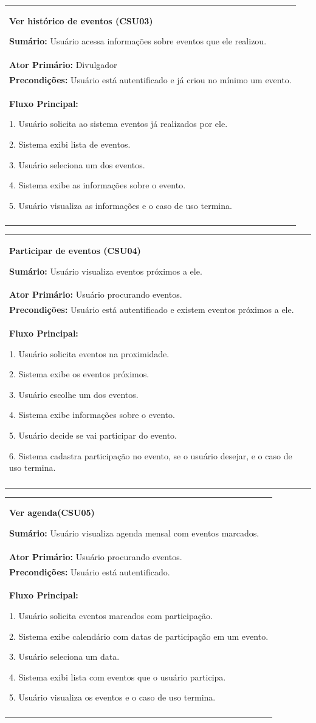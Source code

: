 \documentclass{article}
\newcommand{\sumario}[1] {\textbf{Sumário:} #1\\ \medskip}
\newcommand{\ator}[1] {\textbf{Ator Primário:} #1\\ \medskip}
\newcommand{\precond}[1] {\textbf{Precondições:} #1\\ \medskip}
\newcommand{\fluxo}{\textbf{Fluxo Principal:} \medskip}
\newenvironment{boxed}[1]
    {
\begin{center}
    \begin{tabular}{|p{\textwidth}|}
    \hline
\begin{center}
	{\large \textbf{#1}}
\end{center}
    }
    { 
    \\\\\hline
    \end{tabular} 
    \end{center}
    }
\begin{document}
	\begin{boxed}{Ver histórico de eventos (CSU03)}
	\sumario{Usuário acessa informações sobre eventos que ele realizou.}
	\ator{Divulgador}
	\precond{Usuário está autentificado e já criou no mínimo um evento.}
	\fluxo

	1. Usuário solicita ao sistema eventos já realizados por ele.

	2. Sistema exibi lista de eventos.

	3. Usuário seleciona um dos eventos.

	4. Sistema exibe as informações sobre o evento.

	5. Usuário visualiza as informações e o caso de uso termina.

	\end{boxed}
	\begin{boxed}{Participar de  eventos (CSU04)}
	\sumario{Usuário visualiza eventos próximos a ele.}
	\ator{Usuário procurando eventos.}
	
	\precond{Usuário está autentificado e existem eventos próximos a ele.}

	\fluxo
	
	1. Usuário solicita eventos na proximidade.
	
	2. Sistema exibe os eventos próximos.
	
	3. Usuário escolhe um dos eventos.
	
	4. Sistema exibe informações sobre o evento.
	
	5. Usuário decide se vai participar do evento.
	
	6. Sistema cadastra participação no evento, se o usuário desejar, e o caso de uso termina.\bigskip
	\end{boxed}
	\begin{boxed}{Ver agenda(CSU05)}
	
	\sumario{Usuário visualiza agenda mensal com eventos marcados.}
	
	\ator{Usuário procurando eventos.}
	
	\precond{Usuário está autentificado.}
	
	\fluxo
	
	1. Usuário solicita eventos marcados com participação.
	
	2. Sistema exibe calendário com datas de participação em um evento.
	
	3. Usuário seleciona um data.
	
	4. Sistema exibi lista com eventos que o usuário participa.
	
	5. Usuário visualiza os eventos e o caso de uso termina.
	\end{boxed}
\end{document}
